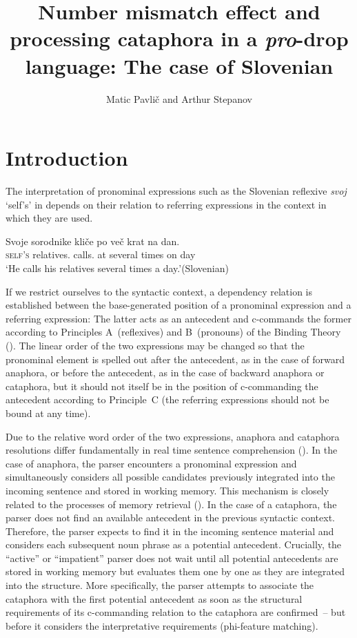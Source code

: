 \documentclass[output=paper,colorlinks,citecolor=brown]{langscibook}
\author{Matic Pavlič\affiliation{University of Ljubljana} and Arthur Stepanov\affiliation{University of Nova Gorica}}
\title[Number mismatch effect and processing cataphora in a \textit{pro}-drop language]{Number mismatch effect and processing cataphora in a \textit{pro}-drop language: The case of Slovenian}
\begin{document}
\maketitle
\section{Introduction}\label{ste-pav:sec:intro}
The interpretation of pronominal expressions such as the Slovenian reflexive \textit{svoj} ‘self’s’ in  depends on their relation to referring expressions in the context in which they are used.

\ea\label{ste-pav:ex:svoje-sorodnike}
\gll Svoje sorodnike kliče po več krat na dan.\\
\textsc{self’s} relatives.{\PL} calls.{\SG} at	several times on day \\
\glt ‘He calls his relatives several times a day.’\hfill (Slovenian)
\z

\noindent If we restrict ourselves to the syntactic context, a dependency relation is established between the base-generated position of a pronominal expression and a referring expression: The latter acts as an antecedent and c-commands the former according to Principles A~(reflexives) and B~(pronouns) of the Binding Theory (\citealt{chomsky1981, reinhart1983}). The linear order of the two expressions may be changed so that the pronominal element is spelled out after the antecedent, as in the case of forward anaphora, or before the antecedent, as in the case of backward anaphora or cataphora, but it should not itself be in the position of c-commanding the antecedent according to Principle~C (the referring expressions should not be bound at any time).

Due to the relative word order of the two expressions, anaphora and cataphora resolutions differ fundamentally in real time sentence comprehension (\citealt{Lust1986, reinhart1986, Blackwell2003, tsimpliFiliaci2004, kennisonBowers2009, LoboSilva2016}). In the case of anaphora, the parser encounters a pronominal expression and simultaneously considers all possible candidates previously integrated into the incoming sentence and stored in working memory. This mechanism is closely related to the processes of memory retrieval (\citealt{chow2014}). In the case of a cataphora, the parser does not find an available antecedent in the previous syntactic context. Therefore, the parser expects to find it in the incoming sentence material and considers each subsequent noun phrase as a potential antecedent. Crucially, the ``active'' or ``impatient'' parser does not wait until all potential antecedents are stored in working memory but evaluates them one by one as they are integrated into the structure. More specifically, the parser attempts to associate the cataphora with the first potential antecedent as soon as the structural requirements of its c-commanding relation to the cataphora are confirmed~-- but before it considers the interpretative requirements (phi-feature matching).
\end{document}
